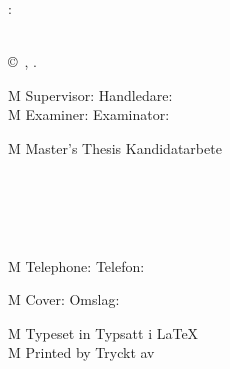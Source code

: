 \begingroup %
\newpage
\thispagestyle{empty}
\vspace*{4.5cm}
\thesisImprintTitle:\\
\thesisImprintSubtitle\\[1ex]
\thesisAuthor \setlength{\parskip}{2\baselineskip}

\copyright~\thesisAuthor, \thesisYear.

\if\thesisType M
    Supervisor:
\else
    Handledare:
\fi
\thesisSupervisor\\
\if\thesisType M
    Examiner:
\else
    Examinator:
\fi
\thesisExaminer

\if\thesisType M
    Master's Thesis
\else
    Kandidatarbete
\fi
\thesisYear\\
\thesisDepartment\\
\thesisDivision\\
\ifx\thesisGroup\undefined
\else
\thesisGroup\\
\fi
\thesisUniversity\\
\thesisImprintLocation\\
\if\thesisType M
    Telephone:
\else
    Telefon:
\fi
\thesisUniversityTel

\vfill
\ifx\thesisCoverFigure\undefined
\else
    \if\thesisType M
        Cover:
    \else
        Omslag:
    \fi
    \thesisCoverFigureCaption
    \setlength{\parskip}{\baselineskip}
\fi

\if\thesisType M
    Typeset in
\else
    Typsatt i
\fi
\LaTeX\\
\ifx\thesisPrintedBy\undefined
\else
    \if\thesisType M
        Printed by
    \else
        Tryckt av
    \fi
    \thesisPrintedBy\\
\fi
\thesisLocation\ \thesisYear
\endgroup

